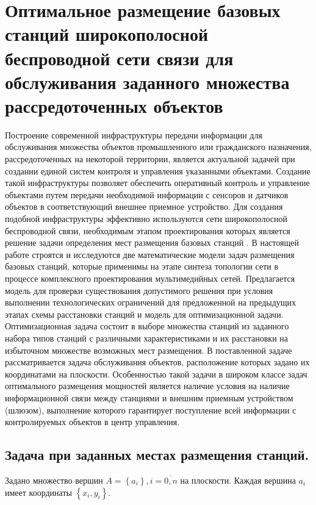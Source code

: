 \chapter{Оптимальное размещение базовых станций широкополосной беспроводной сети связи для обслуживания заданного множества рассредоточенных объектов }\label{ch:ch2}

Построение современной инфраструктуры передачи информации для обслуживания множества объектов промышленного или гражданского назначения, рассредоточенных на некоторой территории, является актуальной задачей при создании единой систем контроля и управления указанными объектами.  Создание такой инфраструктуры позволяет обеспечить оперативный контроль и управление объектами путем передачи необходимой информации с сенсоров и датчиков объектов в соответствующий внешнее приемное устройство. Для создания подобной инфраструктуры эффективно используются сети широкополосной беспроводной связи, необходимым этапом проектирования которых является решение задачи определения мест размещения базовых станций \cite{VishnevskyBook}.
В настоящей работе строятся и исследуются две математические модели задач размещения базовых станций, которые применимы на этапе синтеза топологии сети в процессе комплексного проектирования мультимедийных сетей. Предлагается модель для проверки существования допустимого решения при условия выполнении технологических ограничений для предложенной на предыдущих этапах схемы расстановки станций и модель для оптимизационной задачи. Оптимизационная задача состоит в выборе множества станций из заданного набора типов станций с различными характеристиками и их расстановки на избыточном множестве возможных мест размещения. В поставленной задаче рассматривается задача обслуживания объектов, расположение которых задано их координатами на плоскости. Особенностью такой задачи в широком классе задач оптимального размещения мощностей является наличие условия на наличие информационной связи между станциями и внешним приемным устройством (шлюзом), выполнение которого гарантирует поступление всей информации с контролируемых объектов в центр управления.

\section{Задача при заданных местах размещения станций.}

Задано множество вершин $A= \left\{ a_i \right\}, i=\overline{0,n}$ на плоскости. Каждая вершина $a_i$ имеет координаты $\left\{ x_i, y_i \right\}$.

